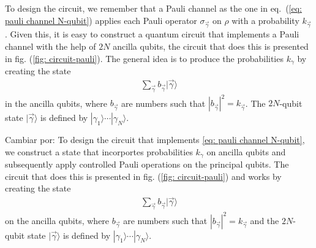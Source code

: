 \documentclass[10pt,letterpaper]{article} %
\begin{document}
To design the circuit, we remember that a Pauli channel as the one in
eq.~(\ref{eq: pauli channel N-qubit})
applies each Pauli operator $\sigma_{\vec{\gamma}}$ on $\rho$ with a probability $k_{\vec{\gamma}}$.
Given this, it is easy to construct a quantum circuit that implements 
a Pauli channel with the help of $2N$ ancilla qubits,
the circuit that does this is presented in fig. (\ref{fig: circuit-pauli}).
The general idea is to produce the probabilities $k_{\gamma}$ by creating the state
\begin{eqnarray}
\label{eq: state}
\sum_{\vec{\gamma}} b_{\vec{\gamma}} |\vec{\gamma} \rangle
\end{eqnarray}
in the ancilla qubits, 
where $b_{\vec{\gamma}}$ are numbers such that $
|b_{\vec{\gamma}}|^2 = k_{\vec{\gamma}}$.
The $2N$-qubit state $|\vec{\gamma}\rangle$  is defined by $|\gamma_1 \rangle \cdots |\gamma_N\rangle$.

{\color{orange} Cambiar por:  To design the circuit that implements \ref{eq: pauli channel N-qubit}, we construct a state that incorportes
probabilities $k_{\gamma}$ on ancilla qubits and subsequently apply controlled 
Pauli operations on the principal qubits.
The circuit that does this is presented in fig. (\ref{fig: circuit-pauli})
and works by creating the state
\begin{eqnarray}
\label{eq: state}
\sum_{\vec{\gamma}} b_{\vec{\gamma}} |\vec{\gamma} \rangle
\end{eqnarray}
on the ancilla qubits, where $b_{\vec{\gamma}}$ are numbers such that $
|b_{\vec{\gamma}}|^2 = k_{\vec{\gamma}}$ and
the $2N$-qubit state $|\vec{\gamma}\rangle$ is defined by $|\gamma_1\rangle \cdots |\gamma_N\rangle$.
}

\end{document}
